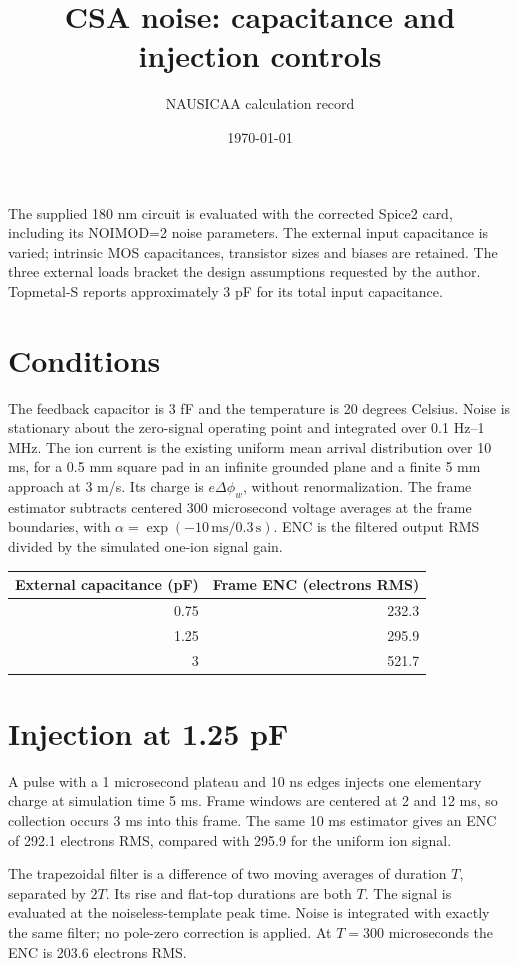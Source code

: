 \documentclass[11pt,a4paper]{article}
\title{CSA noise: capacitance and injection controls}
\author{NAUSICAA calculation record}
\date{\today}
\begin{document}
\maketitle
The supplied 180 nm circuit is evaluated with the corrected Spice2 card,
including its NOIMOD=2 noise parameters. The external input capacitance is
varied; intrinsic MOS capacitances, transistor sizes and biases are retained.
The three external loads bracket the design assumptions requested by the author.
Topmetal-S reports approximately 3 pF for its total input capacitance.

\section*{Conditions}
The feedback capacitor is 3 fF and the temperature is 20 degrees Celsius.
Noise is stationary about the zero-signal operating point and integrated over
0.1 Hz--1 MHz. The ion current is the existing uniform mean arrival distribution
over 10 ms, for a 0.5 mm square pad in an infinite grounded plane and a finite
5 mm approach at 3 m/s. Its charge is $e\Delta\phi_w$, without renormalization.
The frame estimator subtracts centered 300 microsecond voltage averages at
the frame boundaries, with $\alpha=\exp(-10\,\mathrm{ms}/0.3\,\mathrm{s})$.
ENC is the filtered output RMS divided by the simulated one-ion signal gain.

\begin{center}\begin{tabular}{rr}\toprule
External capacitance (pF) & Frame ENC (electrons RMS)\\\midrule
0.75 & 232.3 \\
1.25 & 295.9 \\
3 & 521.7 \\
\bottomrule\end{tabular}\end{center}

\section*{Injection at 1.25 pF}
A pulse with a 1 microsecond plateau and 10 ns edges injects one elementary
charge at simulation time 5 ms. Frame windows are centered at 2 and 12 ms,
so collection occurs 3 ms into this frame.
The same 10 ms estimator gives an ENC of 292.1 electrons RMS, compared
with 295.9 for the uniform ion signal.

The trapezoidal filter is a difference of two moving averages of duration $T$,
separated by $2T$. Its rise and flat-top durations are both $T$.
The signal is evaluated at the noiseless-template peak time. Noise is
integrated with exactly the same filter; no pole-zero correction is applied.
At $T=300$ microseconds the ENC is 203.6 electrons RMS.
\end{document}
